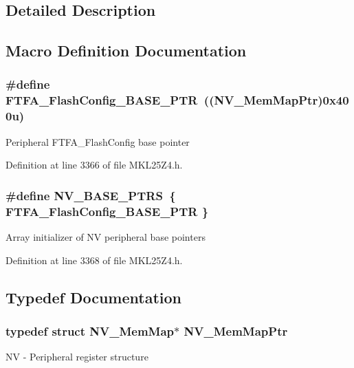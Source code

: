\subsection{Detailed Description}


\subsection{Macro Definition Documentation}
\subsubsection[{\texorpdfstring{F\+T\+F\+A\+\_\+\+Flash\+Config\+\_\+\+B\+A\+S\+E\+\_\+\+P\+TR}{FTFA_FlashConfig_BASE_PTR}}]{\setlength{\rightskip}{0pt plus 5cm}\#define F\+T\+F\+A\+\_\+\+Flash\+Config\+\_\+\+B\+A\+S\+E\+\_\+\+P\+TR~(({\bf N\+V\+\_\+\+Mem\+Map\+Ptr})0x400u)}\hypertarget{group___n_v___peripheral_ga3458652dfc38239f92682556e63596b5}{}\label{group___n_v___peripheral_ga3458652dfc38239f92682556e63596b5}
Peripheral F\+T\+F\+A\+\_\+\+Flash\+Config base pointer 

Definition at line 3366 of file M\+K\+L25\+Z4.\+h.

\subsubsection[{\texorpdfstring{N\+V\+\_\+\+B\+A\+S\+E\+\_\+\+P\+T\+RS}{NV_BASE_PTRS}}]{\setlength{\rightskip}{0pt plus 5cm}\#define N\+V\+\_\+\+B\+A\+S\+E\+\_\+\+P\+T\+RS~\{ {\bf F\+T\+F\+A\+\_\+\+Flash\+Config\+\_\+\+B\+A\+S\+E\+\_\+\+P\+TR} \}}\hypertarget{group___n_v___peripheral_ga1e44e66a8945b675dcebb6fbd6bdc85b}{}\label{group___n_v___peripheral_ga1e44e66a8945b675dcebb6fbd6bdc85b}
Array initializer of NV peripheral base pointers 

Definition at line 3368 of file M\+K\+L25\+Z4.\+h.



\subsection{Typedef Documentation}
\subsubsection[{\texorpdfstring{N\+V\+\_\+\+Mem\+Map\+Ptr}{NV_MemMapPtr}}]{\setlength{\rightskip}{0pt plus 5cm}typedef struct {\bf N\+V\+\_\+\+Mem\+Map}$\ast$ {\bf N\+V\+\_\+\+Mem\+Map\+Ptr}}\hypertarget{group___n_v___peripheral_ga9aac431b01e6b976f2f4e32409ab725f}{}\label{group___n_v___peripheral_ga9aac431b01e6b976f2f4e32409ab725f}
NV -\/ Peripheral register structure 